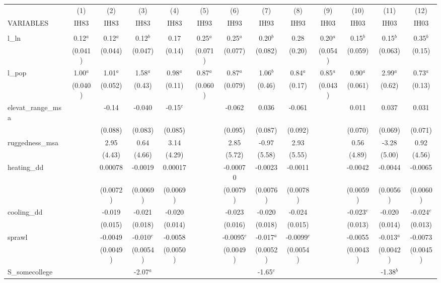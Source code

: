 \documentclass[]{article}
\begin{document}
\begin{tabular}{lcccccccccccc} \hline
 & (1) & (2) & (3) & (4) & (5) & (6) & (7) & (8) & (9) & (10) & (11) & (12) \\
VARIABLES & IH83 & IH83 & IH83 & IH83 & IH93 & IH93 & IH93 & IH93 & IH03 & IH03 & IH03 & IH03 \\ \hline
 &  &  &  &  &  &  &  &  &  &  &  &  \\
l\_ln & 0.12$^a$ & 0.12$^a$ & 0.12$^b$ & 0.17 & 0.25$^a$ & 0.25$^a$ & 0.20$^b$ & 0.28 & 0.20$^a$ & 0.15$^b$ & 0.15$^b$ & 0.35$^b$ \\
 & (0.041) & (0.044) & (0.047) & (0.14) & (0.071) & (0.077) & (0.082) & (0.20) & (0.054) & (0.059) & (0.063) & (0.15) \\
l\_pop & 1.00$^a$ & 1.01$^a$ & 1.58$^a$ & 0.98$^a$ & 0.87$^a$ & 0.87$^a$ & 1.06$^b$ & 0.84$^a$ & 0.85$^a$ & 0.90$^a$ & 2.99$^a$ & 0.73$^a$ \\
 & (0.040) & (0.052) & (0.43) & (0.11) & (0.060) & (0.079) & (0.46) & (0.17) & (0.043) & (0.061) & (0.62) & (0.13) \\
elevat\_range\_msa &  & -0.14 & -0.040 & -0.15$^c$ &  & -0.062 & 0.036 & -0.061 &  & 0.011 & 0.037 & 0.031 \\
 &  & (0.088) & (0.083) & (0.085) &  & (0.095) & (0.087) & (0.092) &  & (0.070) & (0.069) & (0.071) \\
ruggedness\_msa &  & 2.95 & 0.64 & 3.14 &  & 2.85 & -0.97 & 2.93 &  & 0.56 & -3.28 & 0.92 \\
 &  & (4.43) & (4.66) & (4.29) &  & (5.72) & (5.58) & (5.55) &  & (4.89) & (5.00) & (4.56) \\
heating\_dd &  & 0.00078 & -0.0019 & 0.00017 &  & -0.00070 & -0.0023 & -0.0011 &  & -0.0042 & -0.0044 & -0.0065 \\
 &  & (0.0072) & (0.0069) & (0.0069) &  & (0.0079) & (0.0076) & (0.0078) &  & (0.0059) & (0.0056) & (0.0060) \\
cooling\_dd &  & -0.019 & -0.021 & -0.020 &  & -0.023 & -0.020 & -0.024 &  & -0.023$^c$ & -0.020 & -0.024$^c$ \\
 &  & (0.015) & (0.018) & (0.014) &  & (0.016) & (0.018) & (0.015) &  & (0.013) & (0.014) & (0.013) \\
sprawl &  & -0.0049 & -0.010$^c$ & -0.0058 &  & -0.0095$^c$ & -0.017$^a$ & -0.0099$^c$ &  & -0.0055 & -0.013$^a$ & -0.0073 \\
 &  & (0.0049) & (0.0054) & (0.0050) &  & (0.0049) & (0.0052) & (0.0054) &  & (0.0043) & (0.0042) & (0.0045) \\
S\_somecollege &  &  & -2.07$^a$ &  &  &  & -1.65$^c$ &  &  &  & -1.38$^b$ &  \\

\end{tabular}
\end{document}
